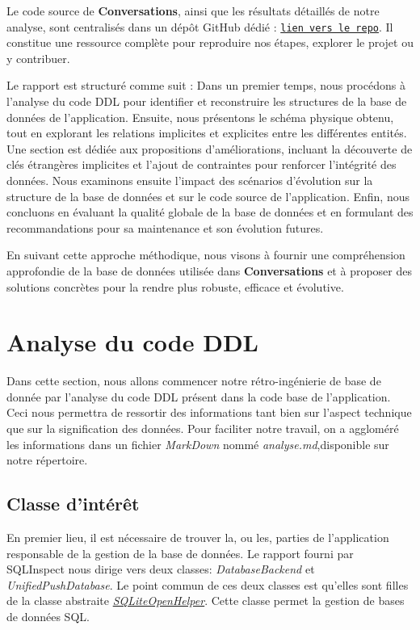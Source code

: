 \documentclass[a4paper,11pt]{article}
\begin{document}
Le code source de \textbf{Conversations}, ainsi que les résultats détaillés de notre analyse, sont centralisés dans un dépôt GitHub dédié : 
\texttt{\href{https://github.com/NPozzaUNamur/Evolution_Group4}{lien vers le repo}}. Il constitue une ressource complète pour reproduire nos étapes, explorer le projet ou y contribuer.

Le rapport est structuré comme suit :
Dans un premier temps, nous procédons à l'analyse du code DDL pour identifier et reconstruire les structures de la base de données de l'application. Ensuite, nous présentons le schéma physique obtenu, tout en explorant les relations implicites et explicites entre les différentes entités. Une section est dédiée aux propositions d'améliorations, incluant la découverte de clés étrangères implicites et l'ajout de contraintes pour renforcer l'intégrité des données. Nous examinons ensuite l'impact des scénarios d'évolution sur la structure de la base de données et sur le code source de l'application. Enfin, nous concluons en évaluant la qualité globale de la base de données et en formulant des recommandations pour sa maintenance et son évolution futures.

En suivant cette approche méthodique, nous visons à fournir une compréhension approfondie de la base de données utilisée dans \textbf{Conversations} et à proposer des solutions concrètes pour la rendre plus robuste, efficace et évolutive.


\section*{Analyse du code DDL}

Dans cette section, nous allons commencer notre rétro-ingénierie de base de donnée par l'analyse du code DDL présent dans la code base de l'application. Ceci nous permettra de ressortir des informations tant bien sur l'aspect technique que sur la signification des données. Pour faciliter notre travail, on a aggloméré les informations dans un fichier \textit{MarkDown} nommé \textit{analyse.md},disponible sur notre répertoire. 

\subsection*{Classe d'intérêt}

En premier lieu, il est nécessaire de trouver la, ou les, parties de l'application responsable de la gestion de la base de données.
Le rapport fourni par SQLInspect nous dirige vers deux classes: \textit{DatabaseBackend} et \textit{UnifiedPushDatabase}.
Le point commun de ces deux classes est qu'elles sont  filles de la classe abstraite \href{https://developer.android.com/reference/android/database/sqlite/SQLiteOpenHelper}{\textit{SQLiteOpenHelper}}. Cette classe permet la gestion de bases de données SQL.
\end{document}
